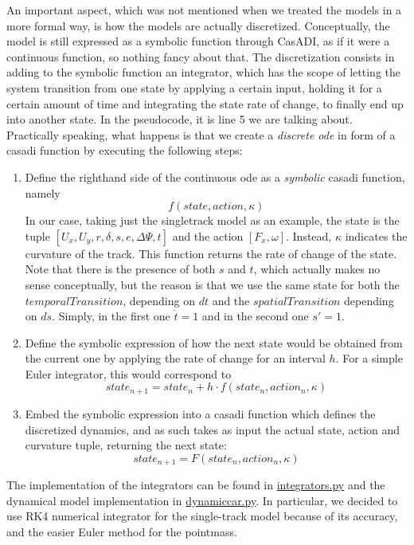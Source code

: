 \documentclass[a4paper, onecolumn, 12pt]{article}
\begin{document}
An important aspect, which was not mentioned when we treated the models in a
more formal way, is how the models are actually discretized. Conceptually, the
model is still expressed as a symbolic function through CasADI, as if it were a
continuous function, so nothing fancy about that. The discretization consists in
adding to the symbolic function an integrator, which has the scope of letting
the system transition from one state by applying a certain input, holding it for
a certain amount of time and integrating the state rate of change, to finally
end up into another state. In the pseudocode, it is line 5 we are talking about.
Practically speaking, what happens is that we create a \textit{discrete ode} in
form of a casadi function by executing the following steps:
\begin{enumerate}
    \item Define the righthand side of the continuous ode as a \textit{symbolic}
    casadi function, namely \[f(state,action,\kappa)\] In our case, taking just
    the singletrack model as an example, the state is the tuple
    \([U_x,U_y,r,\delta,s,e,\Delta\varPsi,t]\) and the action \([F_x,\omega]\).
    Instead, $\kappa$ indicates the curvature of the track. This function
    returns the rate of change of the state. Note that there is the presence of
    both $s$ and $t$, which actually makes no sense conceptually, but the reason
    is that we use the same state for both the $temporalTransition$, depending
    on $dt$ and the $spatialTransition$ depending on $ds$. Simply, in the first
    one $\dot t=1$ and in the second one $s'=1$.
    \item Define the symbolic expression of how the next state would be obtained
    from the current one by applying the rate of change for an interval $h$. For a
    simple Euler integrator, this would correspond to \[state_{n+1}=state_n+h \cdot f(state_n,action_n,\kappa)\]
    \item Embed the symbolic expression into a casadi function which defines the
    discretized dynamics, and as such takes as input the actual state, action
    and curvature tuple, returning the next state: \[state_{n+1}=F(state_n,action_n,\kappa)\]
\end{enumerate}

The implementation of the integrators can be found in
\href{https://github.com/neverorfrog/vehicle-control/blob/main/utils/integrators.py}{integrators.py}
and the dynamical model implementation in
\href{https://github.com/neverorfrog/vehicle-control/blob/main/models/dynamic_car.py}{dynamiccar.py}.
In particular, we decided to use RK4 numerical integrator for the single-track model because of its accuracy,
and the easier Euler method for the pointmass. 
\end{document}
